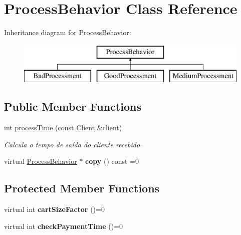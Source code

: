 \hypertarget{classProcessBehavior}{\section{Process\-Behavior Class Reference}
\label{classProcessBehavior}
}
Inheritance diagram for Process\-Behavior\-:\begin{figure}[H]
\begin{center}
\leavevmode
\includegraphics[height=2.000000cm]{classProcessBehavior}
\end{center}
\end{figure}
\subsection*{Public Member Functions}
\begin{DoxyCompactItemize}
\item 
int \hyperlink{classProcessBehavior_a17faac1683e9da239d33026db1fd11f8}{process\-Time} (const \hyperlink{classClient}{Client} \&client)
\begin{DoxyCompactList}\small\item\em Calcula o tempo de saída do cliente recebido. \end{DoxyCompactList}\item 
\hypertarget{classProcessBehavior_afec2ad87efbdc778a93c7e692c97878e}{virtual \hyperlink{classProcessBehavior}{Process\-Behavior} $\ast$ {\bfseries copy} () const =0}\label{classProcessBehavior_afec2ad87efbdc778a93c7e692c97878e}

\end{DoxyCompactItemize}
\subsection*{Protected Member Functions}
\begin{DoxyCompactItemize}
\item 
\hypertarget{classProcessBehavior_a7ccbf0f5499819a6f6c524bfd8595921}{virtual int {\bfseries cart\-Size\-Factor} ()=0}\label{classProcessBehavior_a7ccbf0f5499819a6f6c524bfd8595921}

\item 
\hypertarget{classProcessBehavior_ac3e63322c133f11387759d34dd8fb13c}{virtual int {\bfseries check\-Payment\-Time} ()=0}\label{classProcessBehavior_ac3e63322c133f11387759d34dd8fb13c}

\end{DoxyCompactItemize}


